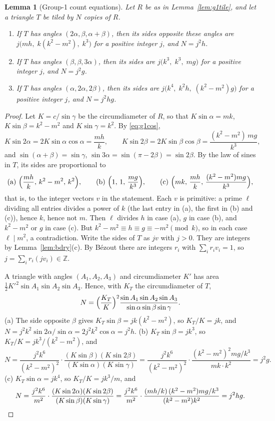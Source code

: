 \documentclass[11pt]{amsart}
\newtheorem{lemma}[theorem]{Lemma}
\theoremstyle{remark}
\newcommand{\Z}{\mathbb{Z}}
\begin{document}
\begin{lemma}[Group-1 count equations]\label{lem:g1counts}
Let $R$ be as in Lemma~\ref{lem:g1tile}, and let a triangle $T$ be tiled by $N$ copies of $R$.
\begin{enumerate}
\item[(a)] If $T$ has angles $(2\alpha,\beta,\alpha+\beta)$, then its sides opposite these angles are $j\bigl(mh,\;k(k^2-m^2),\;k^3\bigr)$ for a positive integer $j$, and $N=j^2h$.
\item[(b)] If $T$ has angles $(\beta,\beta,3\alpha)$, then its sides are $j\bigl(k^3,\;k^3,\;mg\bigr)$ for a positive integer $j$, and $N=j^2g$.
\item[(c)] If $T$ has angles $(\alpha,2\alpha,2\beta)$, then its sides are $j\bigl(k^4,\;k^2h,\;(k^2-m^2)g\bigr)$ for a positive integer $j$, and $N=j^2hg$.
\end{enumerate}
\end{lemma}

\begin{proof}
Let $K=c/\sin\gamma$ be the circumdiameter of $R$, so that $K\sin\alpha=mk$, $K\sin\beta=k^2-m^2$ and $K\sin\gamma=k^2$. By \eqref{eq:g1cos},
\[
K\sin2\alpha=2K\sin\alpha\cos\alpha=\frac{mh}{k},\qquad
K\sin2\beta=2K\sin\beta\cos\beta=\frac{(k^2-m^2)\,mg}{k^3},
\]
and $\sin(\alpha+\beta)=\sin\gamma$, $\sin3\alpha=\sin(\pi-2\beta)=\sin2\beta$. By the law of sines in $T$, its sides are proportional to
\[
\text{(a) }\Bigl(\frac{mh}{k},\,k^2-m^2,\,k^2\Bigr),\qquad
\text{(b) }\Bigl(1,\,1,\,\frac{mg}{k^3}\Bigr),\qquad
\text{(c) }\Bigl(mk,\,\frac{mh}{k},\,\frac{(k^2-m^2)mg}{k^3}\Bigr),
\]
that is, to the integer vectors $v$ in the statement. Each $v$ is primitive: a prime $\ell$ dividing all entries divides a power of $k$ (the last entry in (a), the first in (b) and (c)), hence $k$, hence not $m$. Then $\ell$ divides $h$ in case (a), $g$ in case (b), and $k^2-m^2$ or $g$ in case (c). But $k^2-m^2\equiv h\equiv g\equiv-m^2\pmod k$, so in each case $\ell\mid m^2$, a contradiction. Write the sides of $T$ as $jv$ with $j>0$. They are integers by Lemma~\ref{lem:bdry}(c). By B\'ezout there are integers $r_i$ with $\sum_i r_iv_i=1$, so $j=\sum_i r_i(jv_i)\in\Z$.

A triangle with angles $(A_1,A_2,A_3)$ and circumdiameter $K'$ has area $\tfrac12K'^2\sin A_1\sin A_2\sin A_3$. Hence, with $K_T$ the circumdiameter of $T$,
\[
N=\Bigl(\frac{K_T}{K}\Bigr)^2\frac{\sin A_1\sin A_2\sin A_3}{\sin\alpha\sin\beta\sin\gamma}.
\]
(a) The side opposite $\beta$ gives $K_T\sin\beta=jk(k^2-m^2)$, so $K_T/K=jk$, and $N=j^2k^2\sin2\alpha/\sin\alpha=2j^2k^2\cos\alpha=j^2h$.
(b) $K_T\sin\beta=jk^3$, so $K_T/K=jk^3/(k^2-m^2)$, and
\[
N=\frac{j^2k^6}{(k^2-m^2)^2}\cdot\frac{(K\sin\beta)(K\sin2\beta)}{(K\sin\alpha)(K\sin\gamma)}
=\frac{j^2k^6}{(k^2-m^2)^2}\cdot\frac{(k^2-m^2)^2mg/k^3}{mk\cdot k^2}=j^2g .
\]
(c) $K_T\sin\alpha=jk^4$, so $K_T/K=jk^3/m$, and
\[
N=\frac{j^2k^6}{m^2}\cdot\frac{(K\sin2\alpha)(K\sin2\beta)}{(K\sin\beta)(K\sin\gamma)}
=\frac{j^2k^6}{m^2}\cdot\frac{(mh/k)\,(k^2-m^2)mg/k^3}{(k^2-m^2)k^2}=j^2hg.\qedhere
\]
\end{proof}
\end{document}
